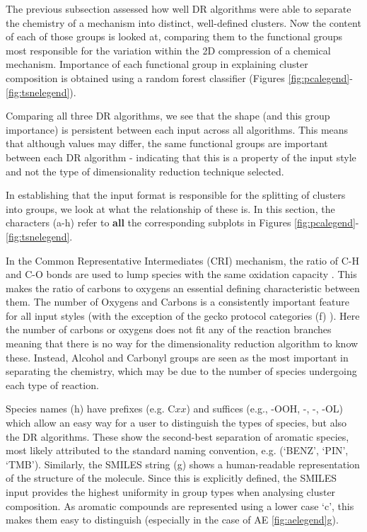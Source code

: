 The previous subsection assessed how well DR algorithms were able to separate the chemistry of a mechanism into distinct, well-defined clusters. Now the content of each of those groups is looked at, comparing them to the functional groups most responsible for the variation within the 2D compression of a chemical mechanism. Importance of each functional group in explaining cluster composition is obtained using a random forest classifier (Figures \ref{fig:pcalegend}-\ref{fig:tsnelegend}).

Comparing all three DR algorithms, we see that the shape (and this group importance) is persistent between each input across all algorithms. This means that although values may differ, the same functional groups are important between each DR algorithm - indicating that this is a property of the input style and not the type of dimensionality reduction technique selected.

In establishing that the input format is responsible for the splitting of clusters into groups, we look at what the relationship of these is. In this section, the characters (a-h) refer to \textbf{all} the corresponding subplots in Figures \ref{fig:pcalegend}-\ref{fig:tsnelegend}.

 In the Common Representative Intermediates (CRI) mechanism, the ratio of C-H and C-O bonds are used to lump species with the same oxidation capacity \citep{cri}. This makes the ratio of carbons to oxygens an essential defining characteristic between them. The number of Oxygens and Carbons is a consistently important feature for all input styles (with the exception of the gecko protocol categories (f) ). Here the number of carbons or oxygens does not fit any of the reaction branches meaning that there is no way for the dimensionality reduction algorithm to know these. Instead, Alcohol and Carbonyl groups are seen as the most important in separating the chemistry, which may be due to the number of species undergoing each type of reaction.

 Species names (h) have prefixes (e.g. C$xx$) and suffices (e.g., -OOH, -, -, -OL) which allow an easy way for a user to distinguish the types of species, but also the DR algorithms. These show the second-best separation of aromatic species, most likely attributed to the standard naming convention, e.g. (`BENZ', `PIN', `TMB'). Similarly, the SMILES string (g) shows a human-readable representation of the structure of the molecule. Since this is explicitly defined, the SMILES input provides the highest uniformity in group types when analysing cluster composition. As aromatic compounds are represented using a lower case `c', this makes them easy to distinguish (especially in the case of AE \autoref{fig:aelegend}g).


